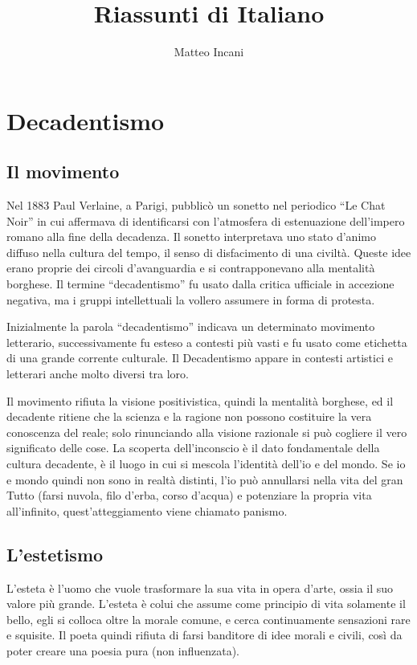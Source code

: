 \documentclass[10pt]{report}
\begin{document}
	
	\title{Riassunti di Italiano}
	\author{Matteo Incani}	
	\maketitle
	\twocolumn
	\chapter{Decadentismo}
	
		\section{Il movimento}
		
	Nel 1883 Paul Verlaine, a Parigi, pubblicò un sonetto nel periodico “Le Chat Noir” in cui affermava di identificarsi con l’atmosfera di estenuazione dell’impero romano alla fine della decadenza.
	 Il sonetto interpretava uno stato d’animo diffuso nella cultura del tempo, il senso di disfacimento di una civiltà. Queste idee erano proprie dei circoli d’avanguardia e si contrapponevano alla mentalità borghese.
	  Il termine “decadentismo” fu usato dalla critica ufficiale in accezione negativa, ma i gruppi intellettuali la vollero assumere in forma di protesta. 
	  
	Inizialmente la parola “decadentismo” indicava un determinato movimento letterario, successivamente fu esteso a contesti più vasti e fu usato come etichetta di una grande corrente culturale. Il Decadentismo appare in contesti artistici e letterari anche molto diversi tra loro.
	
	Il movimento rifiuta la visione positivistica, quindi la mentalità borghese, ed il decadente ritiene che la scienza e la ragione non possono costituire la vera conoscenza del reale; solo rinunciando alla visione razionale si può cogliere il vero significato delle cose.
	 La scoperta dell’inconscio è il dato fondamentale della cultura decadente, è il luogo in cui si mescola l’identità dell’io e del mondo. Se io e mondo quindi non sono in realtà distinti, l’io può annullarsi nella vita del gran Tutto (farsi nuvola, filo d’erba, corso d’acqua) e potenziare la propria vita all’infinito, quest’atteggiamento viene chiamato panismo.
	 
	 \section[Estetismo]{L'estetismo}

	 L’esteta è l’uomo che vuole trasformare la sua vita in opera d’arte, ossia il suo valore più grande.
	  L’esteta è colui che assume come principio di vita solamente il bello, egli si colloca oltre la morale comune, e cerca continuamente sensazioni rare e squisite.
	   Il poeta quindi rifiuta di farsi banditore di idee morali e civili, così da poter creare una poesia pura (non influenzata).
		
\end{document}
